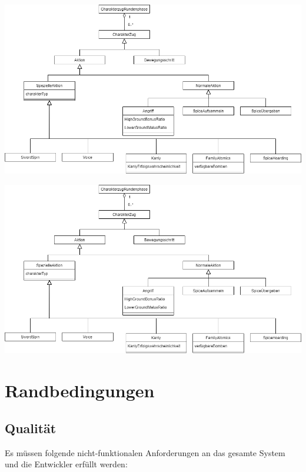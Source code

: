 \documentclass[12pt]{article}
\begin{document}
\vspace{2cm}

\includegraphics[width=\textwidth]{images/DMCharakterzug}
\label{fig:dmcharakterzug}

\vspace{2cm}
\includegraphics[width=\textwidth]{images/DMCharakterzug}
\label{fig:dmcharakterzug}

\newpage

\flushleft

\section{Randbedingungen}
\subsection{Qualität}

Es müssen folgende nicht-funktionalen Anforderungen an das gesamte System und die Entwickler erfüllt werden: 
\end{document}
